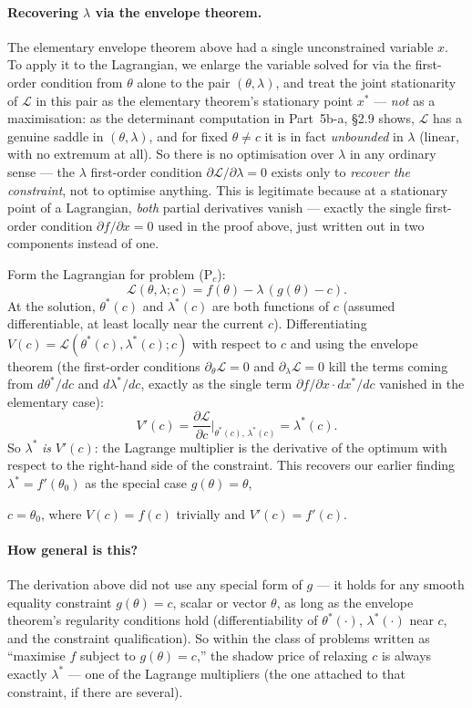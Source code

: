 \documentclass[a4paper,oneside,12pt]{extarticle}
\theoremstyle{plain}
\theoremstyle{definition}
\theoremstyle{remark}
\begin{document}
\paragraph{Recovering $\lambda$ via the envelope theorem.}
The elementary envelope theorem above had a single unconstrained
variable $x$.  To apply it to the Lagrangian, we enlarge the
variable solved for via the first-order condition from $\theta$
alone to the pair $(\theta,\lambda)$, and treat the joint
stationarity of $\mathcal{L}$ in this pair as the elementary
theorem's stationary point $x^*$ --- \emph{not} as a maximisation:
as the determinant computation in Part~5b-a, \S2.9 shows, $\mathcal{L}$
has a genuine saddle in $(\theta,\lambda)$, and for fixed $\theta\ne
c$ it is in fact \emph{unbounded} in $\lambda$ (linear, with no
extremum at all).  So there is no optimisation over $\lambda$ in any
ordinary sense --- the $\lambda$ first-order condition
$\partial\mathcal{L}/\partial\lambda=0$ exists only to \emph{recover
the constraint}, not to optimise anything.  This is legitimate because at a stationary point of a Lagrangian,
\emph{both} partial derivatives vanish --- exactly the single
first-order condition $\partial f/\partial x=0$ used in the proof
above, just written out in two components instead of one.

Form the Lagrangian for problem (P$_c$):
\[
  \mathcal{L}(\theta,\lambda;c) = f(\theta) - \lambda\,(g(\theta)-c).
\]
At the solution, $\theta^*(c)$ and $\lambda^*(c)$ are both functions
of $c$ (assumed differentiable, at least locally near the current
$c$).  Differentiating $V(c) = \mathcal{L}(\theta^*(c),\lambda^*(c);c)$
with respect to $c$ and using the envelope theorem (the
first-order conditions $\partial_\theta\mathcal{L}=0$ and
$\partial_\lambda\mathcal{L}=0$ kill the terms coming from
$d\theta^*/dc$ and $d\lambda^*/dc$, exactly as the single term
$\partial f/\partial x\cdot dx^*/dc$ vanished in the elementary
case):
\[
  V'(c) = \frac{\partial\mathcal{L}}{\partial c}
  \bigg|_{\theta^*(c),\,\lambda^*(c)}
  = \lambda^*(c).
\]
So $\lambda^*$ \emph{is} $V'(c)$: the Lagrange multiplier is the
derivative of the optimum with respect to the right-hand side of
the constraint.  This recovers our earlier finding
$\lambda^*=f'(\theta_0)$ as the special case $g(\theta)=\theta$,

$c=\theta_0$, where $V(c) = f(c)$ trivially and $V'(c)=f'(c)$.

\paragraph{How general is this?}
The derivation above did not use any special form of $g$ --- it
holds for any smooth equality constraint $g(\theta)=c$, scalar or
vector $\theta$, as long as the envelope theorem's regularity
conditions hold (differentiability of $\theta^*(\cdot)$,
$\lambda^*(\cdot)$ near $c$, and the constraint qualification).
So within the class of problems written as ``maximise $f$ subject
to $g(\theta)=c$,'' the shadow price of relaxing $c$ is always
exactly $\lambda^*$ --- one of the Lagrange multipliers (the one
attached to that constraint, if there are several).
\end{document}

